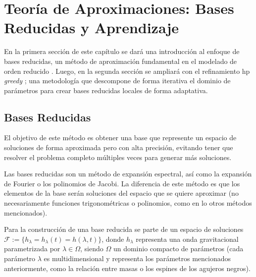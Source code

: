 \chapter{Teoría de Aproximaciones: Bases Reducidas y Aprendizaje}


En la primera sección de este capítulo se dará una introducción al enfoque de bases reducidas, un método de aproximación fundamental en el modelado de orden reducido \cite{Tiglio:2021ysj}. 
Luego, en la segunda sección se ampliará con el refinamiento hp \textit{greedy} \cite{Cerino:2022dhr}; una metodología que descompone de forma iterativa el dominio de parámetros para crear bases reducidas locales de forma adaptativa.


\section{Bases Reducidas}

El objetivo de este método es obtener una base que represente un espacio de soluciones de forma aproximada pero con alta precisión, evitando tener que resolver el problema completo múltiples veces para generar más soluciones. 

Las bases reducidas son un método de expansión espectral, así como la expansión de Fourier o los polinomios de Jacobi. La diferencia de este método es que los elementos de la base serán soluciones del espacio que se quiere aproximar (no necesariamente funciones trigonométricas o polinomios, como en lo otros métodos mencionados).

Para la construcción de una base reducida se parte de un espacio de soluciones \mbox{$\mathcal{F}:= \{ h_{\lambda} = h_{\lambda}(t) = h(\lambda, t)\}$}, donde $h_{\lambda}$ representa una onda gravitacional parametrizada por $\lambda \in \Omega$, siendo $\Omega$ un dominio compacto de parámetros (cada parámetro $\lambda$ es multidimensional y representa los parámetros mencionados anteriormente, como la relación entre masas o los espines de los agujeros negros).

